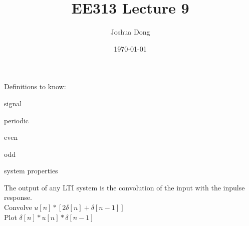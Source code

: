 \documentclass{article}
\begin{document}
\title{EE313\: Lecture 9}
\author{Joshua Dong}
\date{\today}
\maketitle

Definitions to know:
\begin{description}
    \item{signal}
    \item{periodic}
    \item{even}
    \item{odd}
    \item{system properties}
\end{description}

The output of any LTI system is the convolution of the input with the inpulse
response.
\\Convolve $u[n] * [2\delta[n] + \delta[n-1]]$
\\Plot $\delta[n] * u[n] * \delta[n-1]$
\end{document}
